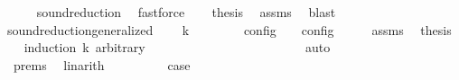 \begin{isabellebody}
\ \ \ \ \isamarkupfalse%
\ sound{\isacharunderscore}reduction\ \isamarkupfalse%
\ fastforce\isanewline
\ \ \isamarkupfalse%
\ {\isacharquery}thesis\ \isamarkupfalse%
\ assms\ \isamarkupfalse%
\ blast\isanewline
{}\isamarkupfalse%
%
\endisatagproof
{\isafoldproof}%
%
\isadelimproof
\isanewline
%
\endisadelimproof
\isanewline
{}\isamarkupfalse%
\ sound{\isacharunderscore}reduction{\isacharunderscore}generalized{\isacharcolon}\isanewline
\ \ \ {\isacartoucheopen}{\isasymS}\ {\isasymhookrightarrow}\isactrlbsup k\isactrlesup \ {\isasymS}\isanewline
\ \ \ \ \ {\isacartoucheopen}{\isasymlbrakk}\ {\isasymS}\ {\isasymrbrakk}\isactrlsub c\isactrlsub o\isactrlsub n\isactrlsub f\isactrlsub i\isactrlsub g\ {\isasymsupseteq}\ {\isasymlbrakk}\ {\isasymS}\ {\isasymrbrakk}\isactrlsub c\isactrlsub o\isactrlsub n\isactrlsub f\isactrlsub i\isactrlsub g{\isacartoucheclose}\isanewline
%
\isadelimproof
%
\endisadelimproof
%
\isatagproof
{}\isamarkupfalse%
\ {\isacharminus}\isanewline
\ \ \isamarkupfalse%
\ assms\ \isamarkupfalse%
\ {\isacharquery}thesis\isanewline
\ \ \isamarkupfalse%
\ {\isacharparenleft}induction\ k\ arbitrary{\isacharcolon}\ {\isasymS}\isanewline
\ \ \ \ \isamarkupfalse%
\ {}\isanewline
\ \ \ \ \ \ \isamarkupfalse%
\ {\isacharasterisk}{\isacharcolon}\ {\isacartoucheopen}{\isasymS}\ {\isasymhookrightarrow}\isactrlesup \ {\isasymS}\ {\isasymLongrightarrow}\ {\isasymS}\ {\isacharequal}\ {\isasymS}\ \isamarkupfalse%
\ auto\isanewline
\ \ \ \ \ \ \isamarkupfalse%
\ \isamarkupfalse%
\ {\isacartoucheopen}{\isasymS}\ {\isacharequal}\ {\isasymS}\ \isamarkupfalse%
\ {\isacharasterisk}\ {\isachardoublequoteopen}{}{\isachardot}prems{\isachardoublequoteclose}\ \isamarkupfalse%
\ linarith\isanewline
\ \ \ \ \ \ \isamarkupfalse%
\ \isamarkupfalse%
\ {\isacharquery}case\ \isamarkupfalse%

\end{isabellebody}
